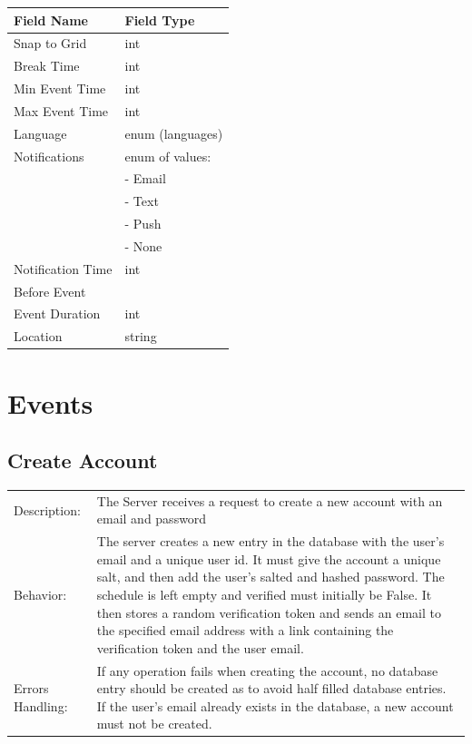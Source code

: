 \documentclass{scrreprt}
\begin{document}
\begin{center}
\begin{longtable}{ | p{3cm} | p{6cm} | }
\hline
\textbf{Field Name} & \textbf{Field Type} \\
\hline
Snap to Grid & int \\
\hline
Break Time & int \\
\hline
Min Event Time & int \\
\hline
Max Event Time & int \\
\hline
Language & enum (languages) \\
\hline
Notifications &  enum of values:  \\
& - Email \\
& - Text \\
& - Push \\
& - None \\
\hline
Notification Time & int \\
Before Event & \\
\hline
Event Duration & int \\
\hline
Location & string \\
\hline
\end{longtable}
\end{center}

\section{Events}
\subsection{Create Account}
\begin{center}
\begin{tabular}{ p{2cm} p{13cm} }
Description: & The Server receives a request to create a new account with an email and password\\
Behavior: & The server creates a new entry in the database with the user's email and a unique user id.  It must give the
account a unique salt, and then add the user's salted and hashed password.  The schedule is left empty and
verified must initially be False.  It then stores a random verification token and sends an email to the specified
email address with a link containing the verification token and the user email.\\
Errors Handling: & If any operation fails when creating the account, no database entry should be created as to avoid half
filled database entries.  If the user's email already exists in the database, a new account must not be created.
\end{tabular}
\end{center}
\end{document}
